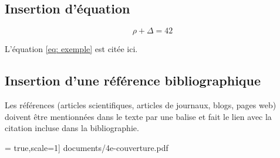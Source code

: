\documentclass{rapportCS}
\begin{document}
\subsection{Insertion d'équation}

\begin{equation} \label{eq: exemple}
\rho + \Delta = 42
\end{equation}

L'équation \ref{eq: exemple} est citée ici. 

\subsection{Insertion d'une référence bibliographique}
Les références (articles scientifiques, articles de journaux, blogs, pages web) doivent être mentionnées dans le texte par une balise \cite{maref} et fait le lien avec la citation incluse dans la bibliographie.




\newpage
{}
\begin{center}
	\begin{abstract}
        \lipsum[1]
        \newline
        \rule{\linewidth}{0.2 mm} \\[0.4 cm]
        \begin{center}\textbf{Summary :}\end{center} 
        \lipsum[1]
    \end{abstract}
\end{center}


\newpage
 = true,scale=1] {documents/4e-couverture.pdf}
\end{document}
